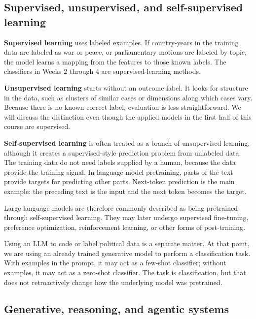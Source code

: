\documentclass[
  a4paper,
]{scrbook}
\begin{document}
\subsection{Supervised, unsupervised, and self-supervised
learning}\label{supervised-unsupervised-and-self-supervised-learning}

\textbf{Supervised learning} uses labeled examples. If country-years in
the training data are labeled as war or peace, or parliamentary motions
are labeled by topic, the model learns a mapping from the features to
those known labels. The classifiers in Weeks 2 through 4 are
supervised-learning methods.

\textbf{Unsupervised learning} starts without an outcome label. It looks
for structure in the data, such as clusters of similar cases or
dimensions along which cases vary. Because there is no known correct
label, evaluation is less straightforward. We will discuss the
distinction even though the applied models in the first half of this
course are supervised.

\textbf{Self-supervised learning} is often treated as a branch of
unsupervised learning, although it creates a supervised-style prediction
problem from unlabeled data. The training data do not need labels
supplied by a human, because the data provide the training signal. In
language-model pretraining, parts of the text provide targets for
predicting other parts. Next-token prediction is the main example: the
preceding text is the input and the next token becomes the target.

Large language models are therefore commonly described as being
pretrained through self-supervised learning. They may later undergo
supervised fine-tuning, preference optimization, reinforcement learning,
or other forms of post-training.

Using an LLM to code or label political data is a separate matter. At
that point, we are using an already trained generative model to perform
a classification task. With examples in the prompt, it may act as a
few-shot classifier; without examples, it may act as a zero-shot
classifier. The task is classification, but that does not retroactively
change how the underlying model was pretrained.

\subsection{Generative, reasoning, and agentic
systems}\label{generative-reasoning-and-agentic-systems}
\end{document}
